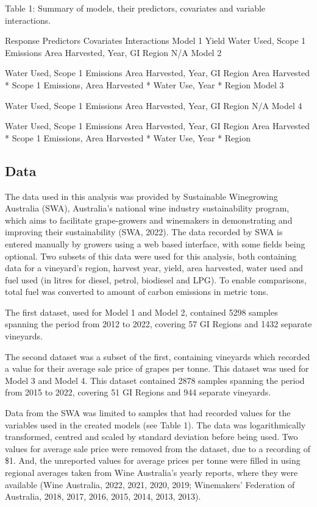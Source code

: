 \documentclass[
  journal=large,
  manuscript=article-type,
  year=2023,
  volume=?,
]{cup-journal}
\begin{document}
Table 1: Summary of models, their predictors, covariates and variable interactions.

Response
Predictors
Covariates
Interactions
Model 1
Yield
Water Used, Scope 1 Emissions
Area Harvested, Year, GI Region
N/A
Model 2

Water Used, Scope 1 Emissions
Area Harvested, Year, GI Region
Area Harvested * Scope 1 Emissions,
Area Harvested * Water Use,
Year * Region
Model 3

Water Used, Scope 1 Emissions
Area Harvested, Year, GI Region
N/A
Model 4

Water Used, Scope 1 Emissions
Area Harvested, Year, GI Region
Area Harvested * Scope 1 Emissions,
Area Harvested * Water Use,
Year * Region
\subsection{Data}
The data used in this analysis was provided by Sustainable Winegrowing Australia (SWA), Australia’s national wine industry sustainability program, which aims to facilitate grape-growers and winemakers in demonstrating and improving their sustainability (SWA, 2022). The data recorded by SWA is entered manually by growers using a web based interface, with some fields being optional. Two subsets of this data were used for this analysis, both containing data for a vineyard’s region, harvest year, yield, area harvested, water used and fuel used (in litres for diesel, petrol, biodiesel and LPG). To enable comparisons, total fuel was converted to amount of carbon emissions in metric tons.

The first dataset, used for Model 1 and Model 2, contained 5298 samples spanning the period from 2012 to 2022, covering 57 GI Regions and 1432 separate vineyards.

The second dataset was a subset of the first, containing vineyards which recorded a value for their average sale price of grapes per tonne. This dataset was used for Model 3 and Model 4. This dataset contained 2878 samples spanning the period from 2015 to 2022, covering 51 GI Regions and 944 separate vineyards.

Data from the SWA was limited to samples that had recorded values for the variables used in the created models (see Table 1). The data was logarithmically transformed, centred and scaled by standard deviation before being used. Two values for average sale price were removed from the dataset, due to a recording of \$1. And, the unreported values for average prices per tonne were filled in using regional averages taken from Wine Australia’s yearly reports, where they were available (Wine Australia, 2022, 2021, 2020, 2019; Winemakers’ Federation of Australia, 2018, 2017, 2016, 2015, 2014, 2013, 2013).
\end{document}

